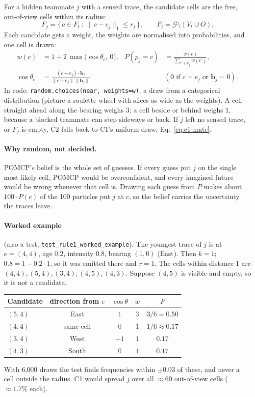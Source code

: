 \documentclass[11pt,a4paper]{article}
\newcommand{\code}[1]{\texttt{#1}}
\theoremstyle{remark}
\begin{document}
For a hidden teammate $j$ with a sensed trace, the candidate cells are the free, out-of-view cells within its radius:
\begin{equation}
  F_j = \{\, c \in F_t \;:\; \lVert c - e_j\rVert_1 \le r_j \,\}, \qquad F_t = \mathcal G \setminus (V_t\cup O).
\end{equation}
Each candidate gets a weight, the weights are normalised into probabilities, and one cell is drawn:
\begin{align}
  w(c) &= 1 + 2\,\max\bigl(\cos\theta_c,\, 0\bigr), &
  P(p_j = c) &= \frac{w(c)}{\sum_{c'\in F_j} w(c')}, \label{eq:rule1}\\
  \cos\theta_c &= \frac{(c-e_j)\cdot \mathbf b_j}{\lVert c-e_j\rVert\,\lVert \mathbf b_j\rVert} &
  &(\text{$0$ if } c=e_j \text{ or } \mathbf b_j = 0). \nonumber
\end{align}
In code: \code{random.choices(near, weights=w)}, a draw from a categorical distribution (picture a roulette wheel with
slices as wide as the weights). A cell straight ahead along the bearing weighs $3$; a cell beside or behind weighs $1$,
because a blocked teammate can step sideways or back. If $j$ left no sensed trace, or $F_j$ is empty, C2 falls back to C1's
uniform draw, Eq.~\eqref{eq:c1-mate}.

\paragraph{Why random, not decided.} POMCP's belief is the whole set of guesses. If every guess put $j$ on the single most
likely cell, POMCP would be overconfident, and every imagined future would be wrong whenever that cell is. Drawing each
guess from $P$ makes about $100\cdot P(c)$ of the 100 particles put $j$ at $c$, so the belief carries the uncertainty the
traces leave.

\paragraph{Worked example} (also a test, \code{test\_rule1\_worked\_example}). The youngest trace of $j$ is at $e=(4,4)$,
age $0.2$, intensity $0.8$, bearing $(1,0)$ (East). Then $k=1$; $0.8 = 1-0.2\cdot1$, so it was emitted there and $r=1$.
The cells within distance 1 are $(4,4),(5,4),(3,4),(4,5),(4,3)$. Suppose $(4,5)$ is visible and empty, so it is not a
candidate.
\begin{center}
\begin{tabular}{lcccc}
\toprule
Candidate & direction from $e$ & $\cos\theta$ & $w$ & $P$ \\
\midrule
$(5,4)$ & East & $1$ & $3$ & $3/6 = 0.50$\\
$(4,4)$ & same cell & $0$ & $1$ & $1/6 \approx 0.17$\\
$(3,4)$ & West & $-1$ & $1$ & $0.17$\\
$(4,3)$ & South & $0$ & $1$ & $0.17$\\
\bottomrule
\end{tabular}
\end{center}
With 6{,}000 draws the test finds frequencies within $\pm0.03$ of these, and never a cell outside the radius. C1 would
spread $j$ over all $\approx 60$ out-of-view cells ($\approx 1.7\%$ each).
\end{document}

